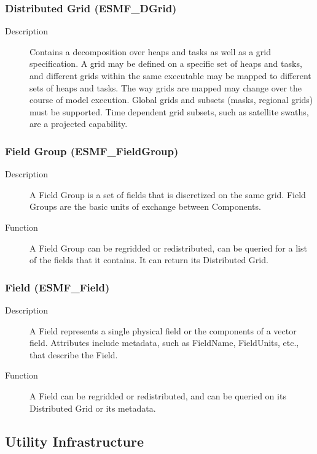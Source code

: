 \subsubsection{Distributed Grid (ESMF\_DGrid)} 
\begin{description}
\item [Description] Contains a decomposition over heaps and tasks 
as well as a grid specification.  A grid may be defined on a specific set of heaps and tasks, and 
different grids within the same executable may be mapped to different sets of heaps 
and tasks.  The way grids are mapped may change over the course of model execution.  
Global grids and subsets (masks, regional grids) must be supported.  Time dependent 
grid subsets, such as satellite swaths, are a projected capability. 
\end{description}

\subsubsection{Field Group (ESMF\_FieldGroup)} 
\begin{description}
\item [Description] A Field Group is a set of fields that is discretized on the same grid.  
Field Groups are the basic units of exchange between Components.  
\item [Function] A Field Group can be regridded or redistributed, can be queried for a 
list of the fields that it contains.  It can return its Distributed Grid. 
\end{description}

\subsubsection{Field (ESMF\_Field)}
\begin{description} 
\item [Description] A Field represents a single physical field or the components of a 
vector field.  Attributes include metadata, such as FieldName, FieldUnits, etc., that describe the
Field.
\item [Function] A Field can be regridded or redistributed, and can be queried on its
Distributed Grid or its metadata.
\end{description}

\subsection{Utility Infrastructure}

